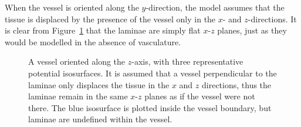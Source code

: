   When the vessel is oriented along the $y$-direction, the model assumes that the tissue is displaced by the presence of the vessel only in the $x$- and $z$-directions. It is clear from Figure~\ref{fig:perpendicular} that the laminae are simply flat $x$-$z$ planes, just as they would be modelled in the absence of vasculature.
  
  \begin{figure}[htbp]
    \centering
    \caption{A vessel oriented along the $z$-axis, with three representative potential isosurfaces. It is assumed that a vessel perpendicular to the laminae only displaces the tissue in the $x$ and $z$ directions, thus the laminae remain in the same $x$-$z$ planes as if the vessel were not there. The blue isosurface is plotted inside the vessel boundary, but laminae are undefined within the vessel.}
    \label{fig:perpendicular}
  \end{figure}

